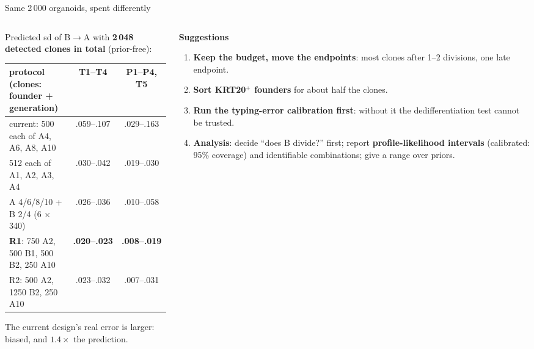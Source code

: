 \documentclass[aspectratio=169,11pt]{beamer}
\newcommand{\BA}{B$\to$A}
\begin{document}
\begin{frame}{Same 2\,000 organoids, spent differently}
\begin{columns}[c]
\begin{column}{0.56\textwidth}
{\small Predicted sd of \BA{} with \textbf{2\,048 detected clones in total} (prior-free):}

\smallskip
{\scriptsize\setlength{\tabcolsep}{3pt}
\begin{tabular}{@{}lcc@{}}\toprule
protocol (clones: founder + generation) & T1--T4 & P1--P4, T5 \\\midrule
current: 500 each of A4, A6, A8, A10 & .059--.107 & .029--.163 \\
512 each of A1, A2, A3, A4 & .030--.042 & .019--.030 \\
A 4/6/8/10 + B 2/4 (6 $\times$ 340) & .026--.036 & .010--.058 \\
\textbf{R1}: 750 A2, 500 B1, 500 B2, 250 A10 & \textbf{.020--.023} & \textbf{.008--.019} \\
R2: 500 A2, 1250 B2, 250 A10 & .023--.032 & .007--.031 \\\bottomrule
\end{tabular}}

{\scriptsize The current design's real error is larger: biased, and $1.4\times$ the prediction.}
\end{column}
\begin{column}{0.42\textwidth}\small
\textbf{Suggestions}
\begin{enumerate}
\item \textbf{Keep the budget, move the endpoints}: most clones after 1--2 divisions, one late endpoint.
\item \textbf{Sort KRT20$^+$ founders} for about half the clones.
\item \textbf{Run the typing-error calibration first}: without it the dedifferentiation test cannot be trusted.
\item \textbf{Analysis}: decide ``does B divide?'' first; report \textbf{profile-likelihood intervals} (calibrated: 95\% coverage) and identifiable combinations; give a range over priors.
\end{enumerate}
\end{column}
\end{columns}
\end{frame}
\end{document}
